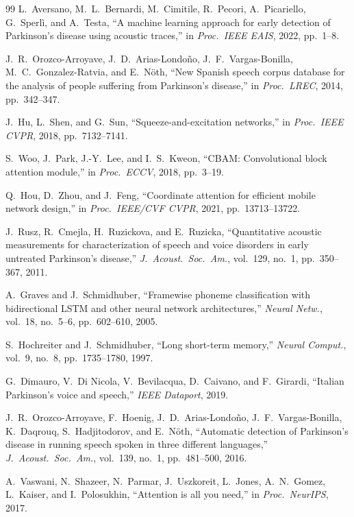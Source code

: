 \documentclass[oneside,openany]{final_report}
\begin{document}
\begin{thebibliography}{99}
 L.\ Aversano, M.\ L.\ Bernardi, M.\ Cimitile, R.\ Pecori, A.\ Picariello, G.\ Sperl\`{i}, and A.\ Testa, ``A machine learning approach for early detection of Parkinson's disease using acoustic traces,'' in \emph{Proc.\ IEEE EAIS}, 2022, pp.~1--8.

 J.\ R.\ Orozco-Arroyave, J.\ D.\ Arias-Londo\~{n}o, J.\ F.\ Vargas-Bonilla, M.\ C.\ Gonzalez-Ratvia, and E.\ N\"{o}th, ``New Spanish speech corpus database for the analysis of people suffering from Parkinson's disease,'' in \emph{Proc.\ LREC}, 2014, pp.~342--347.

 J.\ Hu, L.\ Shen, and G.\ Sun, ``Squeeze-and-excitation networks,'' in \emph{Proc.\ IEEE CVPR}, 2018, pp.~7132--7141.

 S.\ Woo, J.\ Park, J.-Y.\ Lee, and I.\ S.\ Kweon, ``CBAM: Convolutional block attention module,'' in \emph{Proc.\ ECCV}, 2018, pp.~3--19.

 Q.\ Hou, D.\ Zhou, and J.\ Feng, ``Coordinate attention for efficient mobile network design,'' in \emph{Proc.\ IEEE/CVF CVPR}, 2021, pp.~13713--13722.

 J.\ Rusz, R.\ Cmejla, H.\ Ruzickova, and E.\ Ruzicka, ``Quantitative acoustic measurements for characterization of speech and voice disorders in early untreated Parkinson's disease,'' \emph{J.\ Acoust.\ Soc.\ Am.}, vol.~129, no.~1, pp.~350--367, 2011.

 A.\ Graves and J.\ Schmidhuber, ``Framewise phoneme classification with bidirectional LSTM and other neural network architectures,'' \emph{Neural Netw.}, vol.~18, no.~5--6, pp.~602--610, 2005.

 S.\ Hochreiter and J.\ Schmidhuber, ``Long short-term memory,'' \emph{Neural Comput.}, vol.~9, no.~8, pp.~1735--1780, 1997.

 G.\ Dimauro, V.\ Di Nicola, V.\ Bevilacqua, D.\ Caivano, and F.\ Girardi, ``Italian Parkinson's voice and speech,'' \emph{IEEE Dataport}, 2019.

 J.\ R.\ Orozco-Arroyave, F.\ Hoenig, J.\ D.\ Arias-Londo\~{n}o, J.\ F.\ Vargas-Bonilla, K.\ Daqrouq, S.\ Hadjitodorov, and E.\ N\"{o}th, ``Automatic detection of Parkinson's disease in running speech spoken in three different languages,'' \emph{J.\ Acoust.\ Soc.\ Am.}, vol.~139, no.~1, pp.~481--500, 2016.

 A.\ Vaswani, N.\ Shazeer, N.\ Parmar, J.\ Uszkoreit, L.\ Jones, A.\ N.\ Gomez, L.\ Kaiser, and I.\ Polosukhin, ``Attention is all you need,'' in \emph{Proc.\ NeurIPS}, 2017.


\end{thebibliography}
\end{document}
